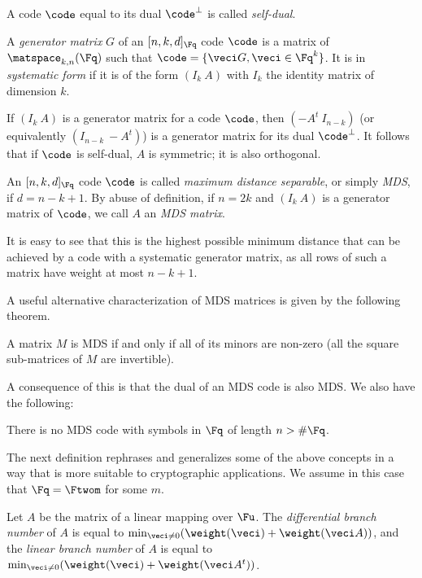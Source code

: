 A code $\code$ equal to its dual $\code^\bot$ is called \emph{self-dual}.


\begin{defi}
A \emph{generator matrix} $G$ of an $[n, k, d]_{\Fq}$ code $\code$ is a matrix of $\matspace_{k,n}(\Fq)$ such that
$\code = \{\veci G, \veci \in \Fq^k\}$. It is in \emph{systematic form} if it is of the form $(I_k~A)$ with
$I_k$ the identity matrix of dimension $k$. 
\end{defi}

If $(I_k~A)$ is a generator matrix for a code $\code$, then $(-A^t~I_{n-k})$ (or equivalently $(I_{n-k}~-A^t)$)
is a generator matrix for its dual $\code^\bot$. It follows that if $\code$ is self-dual, $A$ is symmetric; it is
also orthogonal.

\begin{defi}
An $[n,k,d]_{\Fq}$ code $\code$ is called \emph{maximum distance separable}, or simply \emph{MDS}, if $d = n - k + 1$.
By abuse of definition, if $n = 2k$ and $(I_k~A)$ is a generator matrix of $\code$, we call $A$ an \emph{MDS matrix}.
\end{defi}

It is easy to see that this is the highest possible minimum distance that can be achieved by a code with a
systematic generator matrix, as all rows of such a matrix have weight at most $n - k + 1$.

A useful alternative characterization of MDS matrices is given by the following theorem.

\begin{thm}
\label{thm:mds_minors}
A matrix $M$ is MDS if and only if all of its minors are non-zero (\ie all the square sub-matrices of $M$ are invertible).
\end{thm}

A consequence of this is that the dual of an MDS code is also MDS.
We also have the following:

\begin{conj}
There is no MDS code with symbols in $\Fq$ of length $n > \#\Fq$.
\end{conj}

The next definition rephrases and generalizes some of the above concepts in a way that is more suitable to cryptographic applications.
We assume in this case that $\Fq = \Ftwom$ for some $m$.

\begin{defi}
Let $A$ be the matrix of a linear mapping over $\Fu$.
The \emph{differential branch number} of $A$
is equal to $\min_{\veci \neq 0}(\weight(\veci) + \weight(\veci A))$,
and the \emph{linear branch number} of $A$ is equal to $\min_{\veci \neq 0}(\weight(\veci) + \weight(\veci A^t))$.
\end{defi}

